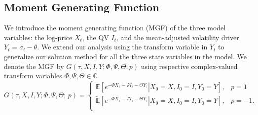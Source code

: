 \documentclass[11pt,a4paper] {article}
\begin{document}
\subsection{Moment Generating Function}

We introduce the moment generating function (MGF) of the three model variables: the log-price $X_t$, the QV $I_t$, and the mean-adjusted volatility driver $Y_t=\sigma_{t}-\theta$. We extend our analysis using the transform variable in $Y_{t}$ to generalize our solution method for all the three state variables in the model. We denote the MGF by $G(\tau,X,I,Y; \Phi,\Psi, \Theta; p)$ using respective complex-valued transform variables $\Phi,\Psi,\Theta\in\mathbb{C}$
\begin{equation} \label{eq:mgf}
G(\tau,X,I,Y; \Phi,\Psi,\Theta;\,p) = 
\begin{cases}
\mathbb{E}[e^{-\Phi X_\tau-\Psi I_\tau-\Theta Y_\tau}\left.\right|X_0=X, I_0=I, Y_0=Y], & p=1\\
\tilde{\mathbb{E}}[e^{-\Phi X_\tau-\Psi I_\tau-\Theta Y_\tau}\left.\right|X_0=X, I_0=I, Y_0=Y], & p=-1.\\
\end{cases}
\end{equation}
\end{document}
